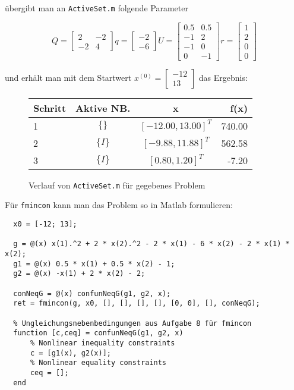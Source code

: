 \documentclass[a4paper, 12pt]{report}
\begin{document}
übergibt man an \lstinline[basicstyle=\ttfamily\color{black}]|ActiveSet.m| folgende Parameter

$$ Q = \begin{bmatrix}2 & -2\\-2 & 4\end{bmatrix} q = \begin{bmatrix}-2\\-6\end{bmatrix} U = \begin{bmatrix} 0.5 & 0.5\\-1 & 2\\-1 & 0\\0 & -1 \end{bmatrix} r = \begin{bmatrix}1\\2\\0\\0\end{bmatrix} $$

und erhält man mit dem Startwert $x^{(0)} = \begin{bmatrix}-12\\13\end{bmatrix}$ das Ergebnis:

\begin{figure}[H]
  \centering
  \def\arraystretch{1.25}
  \begin{tabular}{l|c|c|r}
    \hline
    \textbf{Schritt} & \textbf{Aktive NB.} & \textbf{x} & \textbf{f(x)}\\
    \hline
    1 & $\{\}$ & $[-12.00, 13.00]^T$ & 740.00\\
    2 & $\{I\}$ & $[-9.88, 11.88]^T$ & 562.58\\
    3 & $\{I\}$ & $[0.80, 1.20]^T$ & -7.20\\
    \hline
  \end{tabular}
  \caption{Verlauf von \lstinline[basicstyle=\ttfamily\color{black}]|ActiveSet.m| für gegebenes Problem}
\end{figure}

Für \lstinline[basicstyle=\ttfamily]|fmincon| kann man das Problem so in Matlab formulieren:

\begin{lstlisting}
  x0 = [-12; 13];

  g = @(x) x(1).^2 + 2 * x(2).^2 - 2 * x(1) - 6 * x(2) - 2 * x(1) * x(2);
  g1 = @(x) 0.5 * x(1) + 0.5 * x(2) - 1;
  g2 = @(x) -x(1) + 2 * x(2) - 2;

  conNeqG = @(x) confunNeqG(g1, g2, x);
  ret = fmincon(g, x0, [], [], [], [], [0, 0], [], conNeqG);
  
  % Ungleichungsnebenbedingungen aus Aufgabe 8 für fmincon
  function [c,ceq] = confunNeqG(g1, g2, x)
      % Nonlinear inequality constraints
      c = [g1(x), g2(x)];
      % Nonlinear equality constraints
      ceq = [];
  end\end{lstlisting}
\end{document}
